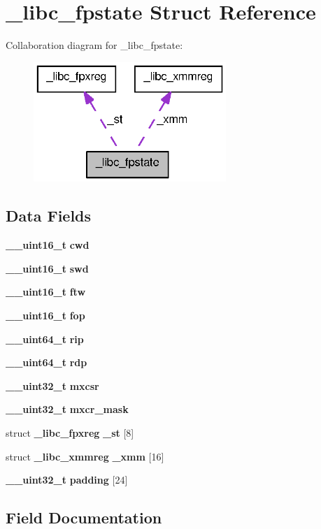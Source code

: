 \section{\_\-libc\_\-fpstate Struct Reference}
\label{struct__libc__fpstate}


Collaboration diagram for \_\-libc\_\-fpstate:
\nopagebreak
\begin{figure}[H]
\begin{center}
\leavevmode
\includegraphics[width=206pt]{struct__libc__fpstate__coll__graph}
\end{center}
\end{figure}
\subsection*{Data Fields}
\begin{DoxyCompactItemize}
\item 
{\bf \_\-\_\-uint16\_\-t} {\bf cwd}
\item 
{\bf \_\-\_\-uint16\_\-t} {\bf swd}
\item 
{\bf \_\-\_\-uint16\_\-t} {\bf ftw}
\item 
{\bf \_\-\_\-uint16\_\-t} {\bf fop}
\item 
{\bf \_\-\_\-uint64\_\-t} {\bf rip}
\item 
{\bf \_\-\_\-uint64\_\-t} {\bf rdp}
\item 
{\bf \_\-\_\-uint32\_\-t} {\bf mxcsr}
\item 
{\bf \_\-\_\-uint32\_\-t} {\bf mxcr\_\-mask}
\item 
struct {\bf \_\-libc\_\-fpxreg} {\bf \_\-st} [8]
\item 
struct {\bf \_\-libc\_\-xmmreg} {\bf \_\-xmm} [16]
\item 
{\bf \_\-\_\-uint32\_\-t} {\bf padding} [24]
\end{DoxyCompactItemize}


\subsection{Field Documentation}
